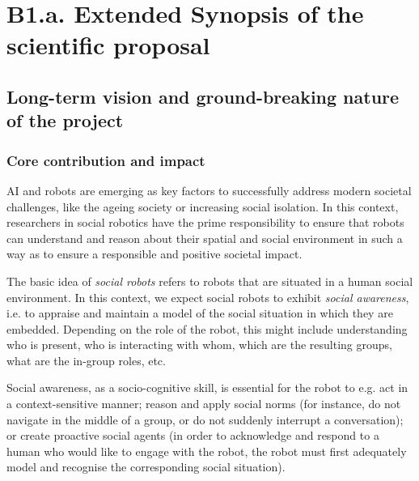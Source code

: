 
\newrefsection


\chapter{B1.a. Extended Synopsis of the scientific proposal}\label{part1}



\section{Long-term vision and ground-breaking nature of the project}

\subsection{Core contribution and impact}

AI and robots are emerging as key factors to successfully address modern societal
challenges, like the ageing society or increasing social isolation. In this
context, researchers in social robotics have the prime responsibility to ensure
that robots can understand and reason about their spatial and social environment
in such a way as to ensure a responsible and positive societal impact.

The basic idea of \emph{social robots} refers to robots that are situated in a
human social environment. In this context, we expect social robots to exhibit
\emph{social awareness}, i.e. to appraise and maintain a model of the social
situation in which they are embedded. Depending on the role of the robot, this
might include understanding who is present, who is interacting with whom, which
are the resulting groups,  what are the in-group roles,  etc.

Social awareness, as a socio-cognitive skill, is essential for the robot to e.g.
act in a context-sensitive manner; reason and apply social norms (for instance,
do not navigate in the middle of a group, or do not suddenly interrupt a
conversation); or create proactive social agents (in order to acknowledge and
respond to a human who would like to engage with the robot, the robot must first
adequately model and recognise the corresponding social situation).


